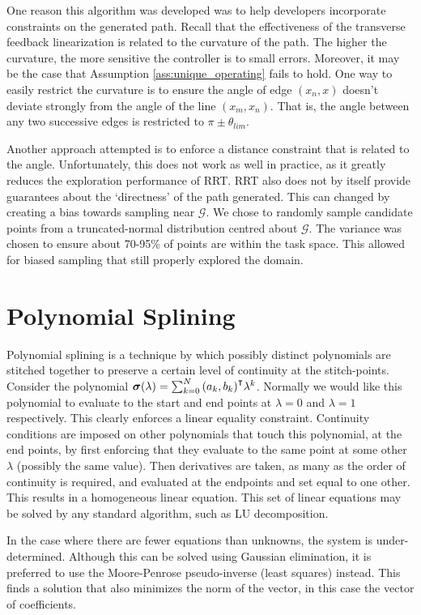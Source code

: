 \documentclass[oneside, 11pt]{book}
\begin{document}
One reason this algorithm was developed was to help developers incorporate constraints on the generated path. Recall that the effectiveness of the transverse feedback linearization is related to the curvature of the path. The higher the curvature, the more sensitive the controller is to small errors. Moreover, it may be the case that Assumption \ref{ass:unique_operating} fails to hold. One way to easily restrict the curvature is to ensure the angle of edge $(x_n, x)$ doesn't deviate strongly from the angle of the line $(x_m, x_n)$. That is, the angle between any two successive edges is restricted to $\pi\pm\theta_{lim}$.

Another approach attempted is to enforce a distance constraint that is related to the angle. Unfortunately, this does not work as well in practice, as it greatly reduces the exploration performance of RRT\cite{Yang14}. RRT also does not by itself provide guarantees about the `directness' of the path generated. This can changed by creating a bias towards sampling near $\mathcal{G}$\cite{LaValle06}\cite{Yang14}. We chose to randomly sample candidate points from a truncated-normal distribution centred about $\mathcal{G}$. The variance was chosen to ensure about 70-95\% of points are within the task space. This allowed for biased sampling that still properly explored the domain.

\section{Polynomial Splining}
Polynomial splining is a technique by which possibly distinct polynomials are stitched together to preserve a certain level of continuity at the stitch-points. Consider the polynomial $\bm{\sigma}(\lambda) = \sum_{k=0}^N{{(a_{k},b_{k})}^{\intercal}\lambda^k}$. Normally we would like this polynomial to evaluate to the start and end points at $\lambda=0$ and $\lambda=1$ respectively. This clearly enforces a linear equality constraint. Continuity conditions are imposed on other polynomials that touch this polynomial, at the end points, by first enforcing that they evaluate to the same point at some other $\lambda$ (possibly the same value). Then derivatives are taken, as many as the order of continuity is required, and evaluated at the endpoints and set equal to one other. This results in a homogeneous linear equation. This set of linear equations may be solved by any standard algorithm, such as LU decomposition.

In the case where there are fewer equations than unknowns, the system is under-determined. Although this can be solved using Gaussian elimination, it is preferred to use the Moore-Penrose pseudo-inverse (least squares) instead. This finds a solution that also minimizes the norm of the vector, in this case the vector of coefficients.
\end{document}
